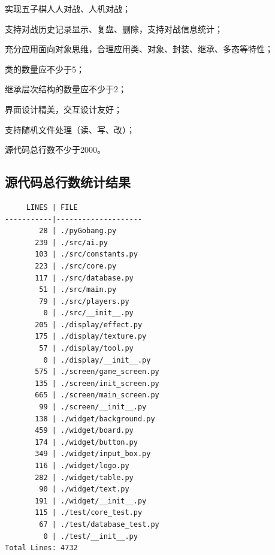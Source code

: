 \documentclass[a4paper, AutoFakeBold=2.17 ,zihao=-4]{ctexart}
\newcommand{\cmark}{\ding{51}}%
\newcommand{\done}{\rlap{$\square$}{\raisebox{2pt}{\large\hspace{1pt}\cmark}}%
\hspace{-2.5pt}}
\begin{document}
\begin{todolist}
    \item[\done] 实现五子棋人人对战、人机对战；
    \item[\done] 支持对战历史记录显示、复盘、删除，支持对战信息统计；
    \item[\done] 充分应用面向对象思维，合理应用类、对象、封装、继承、多态等特性；
    \begin{todolist}
        \item[\done] 类的数量应不少于5；
        \item[\done] 继承层次结构的数量应不少于2；
    \end{todolist}
    \item[\done] 界面设计精美，交互设计友好；
    \item[\done] 支持随机文件处理（读、写、改）；
    \item[\done] 源代码总行数不少于2000。
\end{todolist}

\subsection{源代码总行数统计结果}

\begin{verbatim}
     LINES | FILE
-----------|--------------------
        28 | ./pyGobang.py
       239 | ./src/ai.py
       103 | ./src/constants.py  
       223 | ./src/core.py
       117 | ./src/database.py
        51 | ./src/main.py
        79 | ./src/players.py
         0 | ./src/__init__.py
       205 | ./display/effect.py
       175 | ./display/texture.py
        57 | ./display/tool.py
         0 | ./display/__init__.py
       575 | ./screen/game_screen.py
       135 | ./screen/init_screen.py
       665 | ./screen/main_screen.py
        99 | ./screen/__init__.py
       138 | ./widget/background.py
       459 | ./widget/board.py
       174 | ./widget/button.py
       349 | ./widget/input_box.py
       116 | ./widget/logo.py
       282 | ./widget/table.py
        90 | ./widget/text.py
       191 | ./widget/__init__.py
       115 | ./test/core_test.py
        67 | ./test/database_test.py
         0 | ./test/__init__.py
Total Lines: 4732
\end{verbatim}
\end{document}
